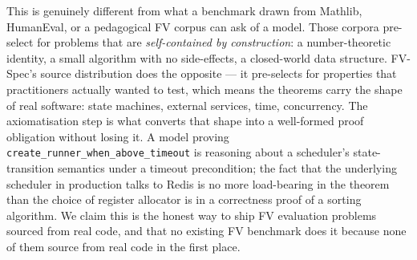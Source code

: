 This is genuinely different from what a benchmark drawn from Mathlib,
HumanEval, or a pedagogical FV corpus can ask of a model. Those
corpora pre-select for problems that are \emph{self-contained by
construction}: a number-theoretic identity, a small algorithm with no
side-effects, a closed-world data structure. FV-Spec's source
distribution does the opposite --- it pre-selects for properties that
practitioners actually wanted to test, which means the theorems carry
the shape of real software: state machines, external services, time,
concurrency. The axiomatisation step is what converts that shape into
a well-formed proof obligation without losing it. A model proving
\texttt{create\_runner\_when\_above\_timeout} is reasoning about a
scheduler's state-transition semantics under a timeout precondition;
the fact that the underlying scheduler in production talks to Redis is
no more load-bearing in the theorem than the choice of register
allocator is in a correctness proof of a sorting algorithm. We claim
this is the honest way to ship FV evaluation problems sourced from real
code, and that no existing FV benchmark does it because none of them
source from real code in the first place.
